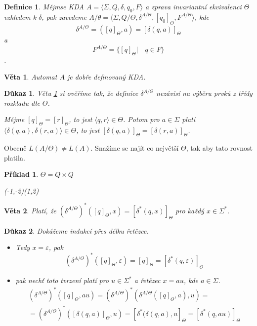 \documentclass[10pt, a4paper, titlepage]{article}
\theoremstyle{note}
\newtheorem{dukaz}{Důkaz}
\newtheorem{veta}{Věta}
\newtheorem{definice}{Definice}
\newtheorem{priklad}{Příklad}
\begin{document}
\begin{definice}
Mějmse KDA $A = \langle \Sigma, Q, \delta, q_{0}, F \rangle$ a zprava invariantní ekvivalenci $\Theta$ vzhledem k
$\delta$, pak zavedeme $A/\theta = \langle \Sigma, Q/\Theta, \delta^{A/\Theta}, [q_{0}]_{\Theta}, F^{A/\Theta} \rangle$, kde
$$\delta^{A/\Theta} = ([q]_{\Theta}, a) = [\delta(q, a)]_{\Theta}$$
a
$$F^{A/\Theta} = \lbrace [q]_{\Theta} | \quad q \in F \rbrace$$.
\end{definice}

\begin{veta}\label{veta-aut}
Automat $A$ je dobře definovaný KDA.
\end{veta}

\begin{dukaz}
Větu \ref{veta-aut} si ověříme tak, že definice $\delta^{A/\Theta}$ nezávisí na výběru prvků z třídy rozkladu
dle $\Theta$.

Mějme $[q]_\Theta = [r]_\Theta$,  to jest $\langle q,r \rangle \in \Theta$. Potom pro $a \in \Sigma$ platí $\langle \delta(q,a), \delta(r,a) \rangle \in \Theta$, to jest $[ \delta(q,a)]_\Theta = [ \delta(r,a)]_\Theta$.
\end{dukaz}

Obecně $L(A/\Theta) \neq L(A)$. Snažíme se najít co největší $\Theta$, tak aby tato rovnost platila.

\begin{priklad}
$\Theta = Q \times Q$
\begin{center}
\begin{VCPicture}{(-1,-2)(1,2)}
\end{VCPicture}
\end{center}

\end{priklad}

\begin{veta}\label{veta-x2}
Platí, že $(\delta^{A/\Theta})^*([q]_\Theta,x)=[\delta^*(q,x)]_\Theta$ pro každý $x \in \Sigma^*$.
\end{veta}

\begin{dukaz}
Dokážeme indukcí přes délku řetězce.
\begin{itemize}
\item
Tedy $x = \varepsilon$, pak
$$(\delta^{A/ \Theta})^{*}([q]_\Theta,\varepsilon)=[q]_\Theta=[\delta^{*}(q,\varepsilon)]_\Theta$$

\item
pak nechť toto tvrzení platí pro $u \in \Sigma^{*}$ a řetězec $x = au$, kde $a \in \Sigma$.
\begin{gather*}
(\delta^{A/ \Theta})^{*}([q]_{\Theta}, au) = (\delta^{A/ \Theta})^{*}(\delta^{A/ \Theta} ([q]_{\Theta}, a), u ) = \\
= (\delta^{A/ \Theta})^{*} ([\delta(q, a)]_{\Theta}, u) = [\delta^{*} (\delta(q, a), u]_{\Theta} = [\delta^{*} (q, au)]_{\Theta}
\end{gather*}
\end{itemize}
\end{dukaz}
\end{document}
